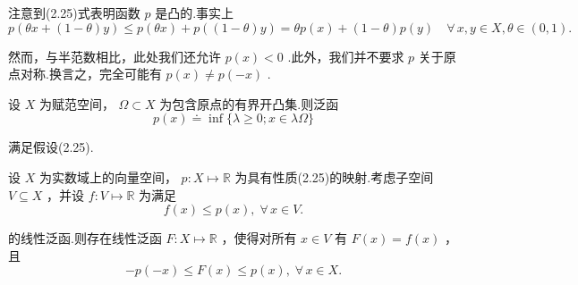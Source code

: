 注意到(2.25)式表明函数 $p$ 是凸的.事实上
\[
p\left( {{\theta x} + \left( {1 - \theta }\right) y}\right)  \leq  p\left( {\theta x}\right)  + p\left( {\left( {1 - \theta }\right) y}\right)  = {\theta p}\left( x\right)  + \left( {1 - \theta }\right) p\left( y\right)\quad\forall\, x,y \in  X,\theta  \in  \left(  {0,1}\right) .
\]

然而，与半范数相比，此处我们还允许 $p\left( x\right)  < 0$ .此外，我们并不要求 $p$ 关于原点对称.换言之，完全可能有 $p\left( x\right)  \neq  p\left( {-x}\right)$ .

\begin{instance}
设 $X$ 为赋范空间， $\Omega  \subset  X$ 为包含原点的有界开凸集.则泛函
\begin{equation}\tag{2.26}
p\left( x\right)  \doteq  \inf \{ \lambda  \geq  0;x \in  {\lambda \Omega }\}
\end{equation}

满足假设(2.25).
\end{instance}

\begin{theorem}
设 $X$ 为实数域上的向量空间， $p : X \mapsto  \mathbb{R}$ 为具有性质(2.25)的映射.考虑子空间 $V \subseteq  X$ ，并设 $f : V \mapsto  \mathbb{R}$ 为满足
\begin{equation}\tag{2.27}
f\left( x\right)  \leq  p\left( x\right), \;\forall\,x \in  V.
\end{equation}

的线性泛函.则存在线性泛函 $F : X \mapsto  \mathbb{R}$ ，使得对所有 $x \in  V$ 有 $F\left( x\right)  = f\left( x\right)$ ，且
\begin{equation}\tag{2.28}
- p\left( {-x}\right)  \leq  F\left( x\right)  \leq  p\left( x\right), \;\forall\,x \in  X.
\end{equation}
\end{theorem}

